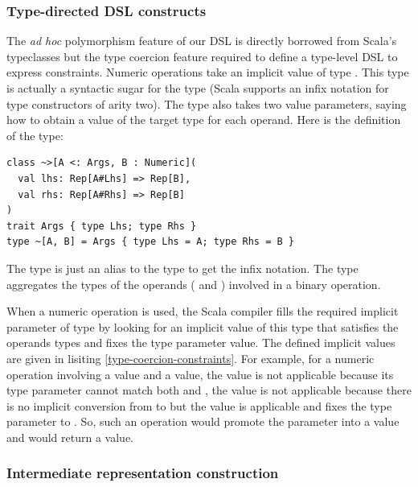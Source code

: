 \documentclass[american,english,runningheads]{llncs}
\begin{document}
\subsubsection{Type-directed DSL constructs}

The \emph{ad hoc} polymorphism feature of our DSL is directly borrowed from Scala’s typeclasses but the type coercion
feature required to define a type-level DSL to express constraints. Numeric operations take an implicit value of
type . This type is actually a syntactic sugar for the type \code{\~>[\~[A, B], C]} (Scala
supports an infix notation for type constructors of arity two). The \code{\~\>} type also takes two value parameters,
saying how to obtain a value of the target type for each operand. Here is the definition of the \code{\~\>} type:

\begin{lstlisting}
class ~>[A <: Args, B : Numeric](
  val lhs: Rep[A#Lhs] => Rep[B],
  val rhs: Rep[A#Rhs] => Rep[B]
)
trait Args { type Lhs; type Rhs }
type ~[A, B] = Args { type Lhs = A; type Rhs = B }
\end{lstlisting}

The \code{\~} type is just an alias to the  type to get the infix notation. The  type
aggregates the types of the operands ( and ) involved in a binary operation.

When a numeric operation is used, the Scala compiler fills the required implicit parameter of type
 by looking for an implicit value of this type that satisfies the operands types and fixes the
 type parameter value. The defined implicit values are given in lisiting \ref{type-coercion-constraints}.
For example, for a numeric operation involving a  value and a  value, the
 value is not applicable because its  type parameter cannot match both  and
, the  value is not applicable because there is no implicit conversion from
 to  but the  value is applicable and fixes the  type parameter to
. So, such an operation would promote the  parameter into a  value and
would return a  value.

\subsubsection{Intermediate representation construction}
\end{document}
